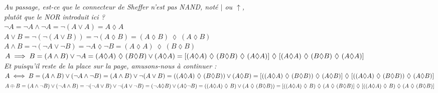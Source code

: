 \documentclass[a4paper, 10pt]{report}
\begin{document}
	\colorbox{solution}
	{
		\begin{minipage}{0.9\textwidth}
		{\color{blue}
			\textit{Au passage, est-ce que le connecteur de Sheffer
			n'est pas NAND, noté $|$ ou $\uparrow$,\\
			plutôt que le NOR introduit ici ?}
		}\\
		
		$\lnot A = \lnot A \land \lnot A
				= \lnot(A \lor A) = A \lozenge A$ \\
			
		$A \lor B = \lnot (\lnot (A \lor B)) = \lnot (A \lozenge B)
				= (A \lozenge B)\ \lozenge\ (A \lozenge B)$ \\
		
		$A \land B = \lnot (\lnot A \lor \lnot B)
			= \lnot A \lozenge \lnot B
			= (A \lozenge A)\ \lozenge\ (B \lozenge B)$ \\
		
		$A \implies B = (A \land B) \lor \lnot A
			= (A \lozenge A)\ \lozenge\ (B \lozenge B) \lor (A \lozenge A)
			\\ = [(A \lozenge A)\ \lozenge\ (B \lozenge B)\
			\lozenge\ (A \lozenge A)]\ \lozenge\
			[(A \lozenge A)\ \lozenge\ (B \lozenge B)\
			\lozenge\ (A \lozenge A)]$\\
		
		{\color{blue}
		\textit{Et puisqu'il reste de la place sur la page,
		amusons-nous à continuer :}\\
		
		$A \iff B = (A \land B) \lor (\lnot A \land \lnot B)
			= (A \land B) \lor \lnot(A \lor B)
			= ((A \lozenge A)\ \lozenge\ (B \lozenge B)) \lor (A \lozenge B)
			\\ = [((A \lozenge A)\ \lozenge\ (B \lozenge B))\
				\lozenge\ (A \lozenge B)]\ \lozenge\
			[((A \lozenge A)\ \lozenge\ (B \lozenge B))\
			\lozenge\ (A \lozenge B)]$\\
			
		$A \oplus B = (A \land \lnot B) \lor (\lnot A \land B)
			= \lnot(\lnot A \lor B) \lor \lnot(A \lor \lnot B)
			= (\lnot A \lozenge B) \lor (A \lozenge \lnot B) \\
			= ((A \lozenge A)\ \lozenge\ B) \lor
				(A\ \lozenge\ (B \lozenge B))
			= [((A \lozenge A)\ \lozenge\ B)\
				\lozenge\ (A\ \lozenge\ (B \lozenge B)]\
			\lozenge\
			[((A \lozenge A)\ \lozenge\ B)\
				\lozenge\ (A\ \lozenge\ (B \lozenge B)]$
		}
		\end{minipage}
	}
	
\end{document}
